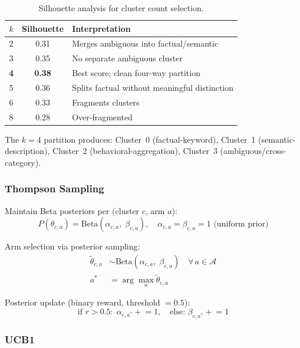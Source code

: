 \documentclass[11pt,letterpaper]{article}
\begin{document}
\begin{table}[H]
\centering
\begin{tabular}{ccp{7cm}}
\toprule
$k$ & Silhouette & Interpretation \\
\midrule
2 & 0.31 & Merges ambiguous into factual/semantic \\
3 & 0.35 & No separate ambiguous cluster \\
\textbf{4} & \textbf{0.38} & Best score; clean four-way partition \\
5 & 0.36 & Splits factual without meaningful distinction \\
6 & 0.33 & Fragments clusters \\
8 & 0.28 & Over-fragmented \\
\bottomrule
\end{tabular}
\caption{Silhouette analysis for cluster count selection.}
\label{tab:silhouette}
\end{table}

The $k=4$ partition produces: Cluster~0 (factual-keyword), Cluster~1 (semantic-description), Cluster~2 (behavioral-aggregation), Cluster~3 (ambiguous/cross-category).

\subsubsection{Thompson Sampling}

Maintain Beta posteriors per (cluster $c$, arm $a$):
\begin{equation}
  P(\theta_{c,a}) = \text{Beta}(\alpha_{c,a},\; \beta_{c,a}), \quad \alpha_{c,a} = \beta_{c,a} = 1 \text{ (uniform prior)}
\end{equation}

Arm selection via posterior sampling:
\begin{align}
  \tilde{\theta}_{c,a} &\sim \text{Beta}(\alpha_{c,a},\; \beta_{c,a}) \quad \forall\, a \in \mathcal{A} \\
  a^* &= \arg\max_a \tilde{\theta}_{c,a}
\end{align}

Posterior update (binary reward, threshold $= 0.5$):
\begin{equation}
  \text{if } r > 0.5: \; \alpha_{c,a^*} \mathrel{+}= 1, \quad \text{else: } \beta_{c,a^*} \mathrel{+}= 1
\end{equation}

\subsubsection{UCB1}
\end{document}

